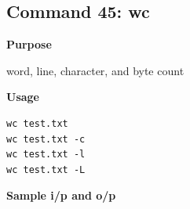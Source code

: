\subsection{Command 45: wc} 
\textbf{Purpose}
\begin{flushleft}
 word, line, character, and byte count
\end{flushleft}
\textbf{Usage}
\begin{verbatim}
wc test.txt
wc test.txt -c
wc test.txt -l
wc test.txt -L
\end{verbatim}
\textbf{Sample i/p and o/p}
\begin{figure}[H] 
\end{figure}
